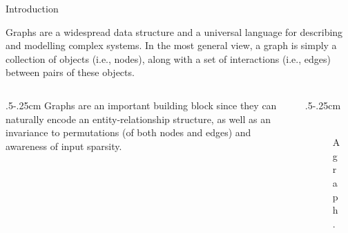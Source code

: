 \documentclass[10pt, aspectratio=169, compress, protectframetitle, handout]{beamer}
\begin{document}
\begin{frame}{Introduction}
    
    Graphs are a widespread data structure and a universal language for describing and modelling complex systems. In the most general view, a graph is simply a collection of objects (i.e., nodes), along with a set of interactions (i.e., edges) between pairs of these objects. 

    \begin{columns}[onlytextwidth]
        \begin{column}{.5\textwidth-.25cm}
            Graphs are an important building block since they can naturally encode an \alert{entity-relationship structure}, as well as an \alert{invariance to permutations} (of both nodes and edges) and awareness of \alert{input sparsity}.
        \end{column}
        \begin{column}{.5\textwidth-.25cm}
            \begin{figure}
                \centering
                \includegraphics[width=3.8cm]{figures/Graph}
                \caption{A graph.}
            \end{figure}
        \end{column}
    \end{columns}
    
\end{frame}
\end{document}
